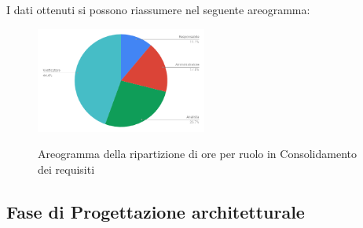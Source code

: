 I dati ottenuti si possono riassumere nel seguente areogramma:
\begin{figure}[H] 
			\centering 
				\includegraphics[width=0.5\textwidth]{res/images/areogramma_consolidamento.png}\\
				\caption{Areogramma della ripartizione di ore per ruolo in Consolidamento dei requisiti}
			\label{AreogrammaConsolidaemnto}
\end{figure}

\subsection{Fase di Progettazione architetturale}
